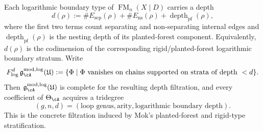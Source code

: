 \begin{definition}
\label{def:rigid-planted-forest-depth-filtration}
Each logarithmic boundary type of
$\operatorname{FM}_n(X\mathbin{|}D)$ carries a depth
\[
d(\rho)
:=
\#E_{\mathrm{sep}}(\rho)
+\#E_{\mathrm{ns}}(\rho)
+\operatorname{depth}_{\mathrm{pf}}(\rho),
\]
where the first two terms count separating and non-separating internal
edges and $\operatorname{depth}_{\mathrm{pf}}(\rho)$ is the nesting depth of
its planted-forest component.  Equivalently, $d(\rho)$ is the codimension
of the corresponding rigid/planted-forest logarithmic boundary stratum.
Write
\[
F^d_{\log}\,\mathfrak g^{\mathrm{mod,log}}_{\cA}(\mathfrak U)
:=
\{\Phi\mid \Phi\text{ vanishes on chains supported on strata of depth }<d\}.
\]
Then $\mathfrak g^{\mathrm{mod,log}}_{\cA}(\mathfrak U)$ is complete for the
resulting depth filtration, and every coefficient of $\Theta_\cA$ acquires a
tridegree
\[
(g,n,d)= (\text{loop genus},\text{arity},\text{logarithmic boundary depth}).
\]
This is the concrete filtration induced by Mok's planted-forest and rigid-type
stratification.
\end{definition}

